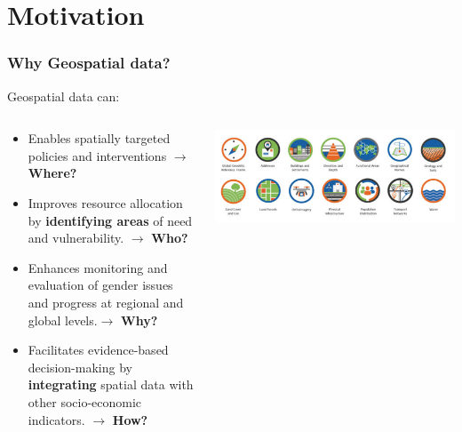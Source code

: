 \documentclass[xcolor=x11names,aspectratio=169, compress]{beamer}
\renewcommand{\(}{\begin{columns}}
\renewcommand{\)}{\end{columns}}
\newcommand{\<}[1]{\begin{column}{#1}}
\renewcommand{\>}{\end{column}}
\begin{document}
\section{Motivation}

\begin{frame}
    \frametitle{Why Geospatial data? }
    Geospatial data can:
    \begin{columns}[T]
        \begin{column}{0.7\textwidth}
            \begin{itemize}[<+->]
            \item Enables spatially targeted policies and interventions $\rightarrow$ \textbf{Where?}
            \item Improves resource allocation by \textbf{identifying areas} of need and vulnerability. $\rightarrow$ \textbf{Who?}
            \item Enhances monitoring and evaluation of gender issues and progress at regional and global levels.$\rightarrow$ \textbf{Why?}
            \item Facilitates evidence-based decision-making by \textbf{integrating} spatial data with other socio-economic indicators. $\rightarrow$ \textbf{How?}
            \end{itemize}
        \end{column}
        \begin{column}{0.3\textwidth}
            \includegraphics[width=\textwidth]{GeospatialInformation.PNG}
        \end{column}
    \end{columns}
\end{frame}
\end{document}
